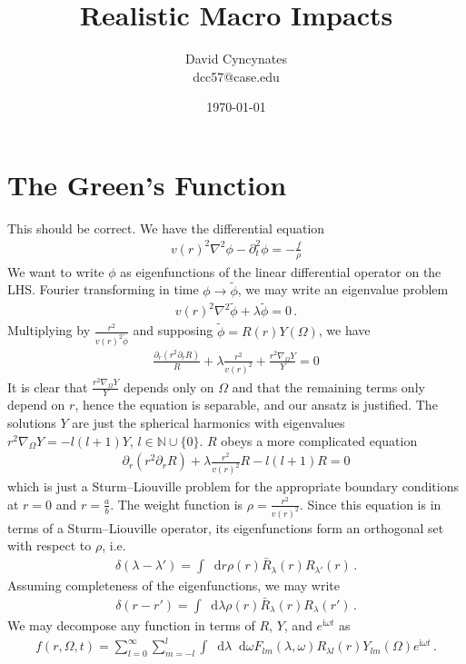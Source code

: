 \documentclass{article}
\title{Realistic Macro Impacts}
\author{David Cyncynates \\ dcc57@case.edu}
\date{\today}
\newcommand*\diff{\mathop{}\!\mathrm{d}}
\newcommand*\N{\mathbb N}
\newcommand*\te[1]{\text{#1}}
\newcommand*\f[2]{\frac{#1}{#2}}
\newcommand*\I{\te{i}}
\begin{document}
\maketitle
\section{The Green's Function}
This should be correct. We have the differential equation
\begin{align}
v(r)^2\nabla^2\phi-\partial_t^2\phi=-\f{f}{\rho}
\end{align}
We want to write $\phi$ as eigenfunctions of the linear differential operator on the LHS. Fourier transforming in time $\phi\to\tilde\phi$, we may write an eigenvalue problem
\begin{align}
v(r)^2\nabla^2\tilde\phi+\lambda\tilde\phi=0\,.
\end{align}
Multiplying by $\f{r^2}{v(r)^2\tilde\phi}$ and supposing $\tilde\phi=R(r)Y(\Omega)$, we have
\begin{align}
\f{\partial_r(r^2\partial_r R)}{R}+\lambda\f{r^2}{v(r)^2}+\f{r^2\nabla_\Omega Y}{Y}=0
\end{align}
It is clear that $\f{r^2\nabla_\Omega Y}{Y}$ depends only on $\Omega$ and that the remaining terms only depend on $r$, hence the equation is separable, and our ansatz is justified. The solutions $Y$ are just the spherical harmonics with eigenvalues $r^2\nabla_{\Omega}Y=-l(l+1)Y$, $l\in\N\cup\{0\}$. $R$ obeys a more complicated equation
\begin{align}
\partial_r(r^2\partial_r R)+\lambda\f{r^2}{v(r)^2}R-l(l+1)R=0
\end{align}
which is just a Sturm--Liouville problem for the appropriate boundary conditions at $r=0$ and $r=\f ab$. The weight function is $\rho=\f{r^2}{v(r)^2}$. Since this equation is in terms of a Sturm--Liouville operator, its eigenfunctions form an orthogonal set with respect to $\rho$, i.e.
\begin{align}
\delta(\lambda-\lambda')=\int\diff r\rho(r) \bar R_\lambda(r)R_{\lambda'}(r)\,.
\end{align}
Assuming completeness of the eigenfunctions, we may write
\begin{align}
\delta(r-r')=\int\diff\lambda\rho(r)\bar R_\lambda(r)R_\lambda(r')\,.
\end{align}
We may decompose any function in terms of $R$, $Y$, and $e^{\I\omega t}$ as
\begin{align}
f(r,\Omega,t)=\sum_{l=0}^\infty\sum_{m=-l}^l\int\diff\lambda\diff\omega F_{lm}(\lambda,\omega)R_{\lambda l}(r)Y_{lm}(\Omega)e^{\I\omega t}\,.
\end{align}
\end{document}
